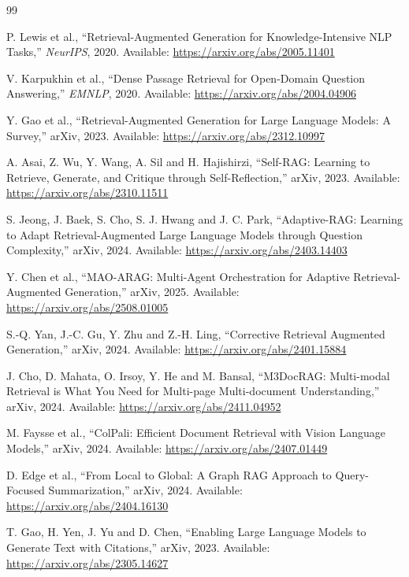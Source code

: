 \documentclass{article}
\begin{document}
\begin{thebibliography}{99}
\small

P. Lewis et al., ``Retrieval-Augmented Generation for Knowledge-Intensive NLP Tasks,'' \textit{NeurIPS}, 2020. Available: \url{https://arxiv.org/abs/2005.11401}

V. Karpukhin et al., ``Dense Passage Retrieval for Open-Domain Question Answering,'' \textit{EMNLP}, 2020. Available: \url{https://arxiv.org/abs/2004.04906}

Y. Gao et al., ``Retrieval-Augmented Generation for Large Language Models: A Survey,'' arXiv, 2023. Available: \url{https://arxiv.org/abs/2312.10997}

A. Asai, Z. Wu, Y. Wang, A. Sil and H. Hajishirzi, ``Self-RAG: Learning to Retrieve, Generate, and Critique through Self-Reflection,'' arXiv, 2023. Available: \url{https://arxiv.org/abs/2310.11511}

S. Jeong, J. Baek, S. Cho, S. J. Hwang and J. C. Park, ``Adaptive-RAG: Learning to Adapt Retrieval-Augmented Large Language Models through Question Complexity,'' arXiv, 2024. Available: \url{https://arxiv.org/abs/2403.14403}

Y. Chen et al., ``MAO-ARAG: Multi-Agent Orchestration for Adaptive Retrieval-Augmented Generation,'' arXiv, 2025. Available: \url{https://arxiv.org/abs/2508.01005}

S.-Q. Yan, J.-C. Gu, Y. Zhu and Z.-H. Ling, ``Corrective Retrieval Augmented Generation,'' arXiv, 2024. Available: \url{https://arxiv.org/abs/2401.15884}

J. Cho, D. Mahata, O. Irsoy, Y. He and M. Bansal, ``M3DocRAG: Multi-modal Retrieval is What You Need for Multi-page Multi-document Understanding,'' arXiv, 2024. Available: \url{https://arxiv.org/abs/2411.04952}

M. Faysse et al., ``ColPali: Efficient Document Retrieval with Vision Language Models,'' arXiv, 2024. Available: \url{https://arxiv.org/abs/2407.01449}

D. Edge et al., ``From Local to Global: A Graph RAG Approach to Query-Focused Summarization,'' arXiv, 2024. Available: \url{https://arxiv.org/abs/2404.16130}

T. Gao, H. Yen, J. Yu and D. Chen, ``Enabling Large Language Models to Generate Text with Citations,'' arXiv, 2023. Available: \url{https://arxiv.org/abs/2305.14627}


\end{thebibliography}
\end{document}
